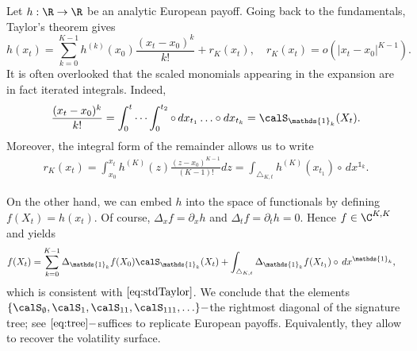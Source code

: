 \begin{example}
Let $h:\R\to \R$ be an analytic European payoff.
Going back to the fundamentals, Taylor's theorem gives %
\begin{equation}\label{eq:stdTaylor}
    h(x_t)= \sum_{k=0}^{K-1} h^{(k)}(x_0) \frac{(x_t-x_0)^k}{k!} + r_K(x_t), \quad r_K(x_t)= o(|x_t-x_0|^{K-1}).
\end{equation}
 It is often overlooked that the scaled monomials appearing in the expansion are in fact iterated integrals. Indeed, 
$$\frac{(x_t-x_0)^k}{k!} = \int_0^t \cdots \int_0^{t_2} \circ \, dx_{t_1}\ldots \circ dx_{t_k} = \calS_{\mathds{1}_k}(X_t). $$ 
Moreover, the integral form of the remainder allows us to write
\begin{align*}
    r_K(x_t) = \int_{x_0}^{x_t} h^{(K)}(z) \frac{(z-x_0)^{K-1}}{(K-1)!} dz 
    = \int_{\triangle_{K,t}} h^{(K)}(x_{t_1}) \circ \, dx^{\mathds{1}_k}.
\end{align*}

On the other hand, we can embed $h$ into the space of functionals by defining
$f(X_t) = h(x_t)$. Of course, $\Delta_x f = \partial_x h$ and $\Delta_t f = \partial_t h = 0$. Hence $f\in \C^{K,K}$ and   yields
\begin{align*}
    f(X_t)  %
    &= \sum_{k=0}^{K-1} \Delta_{\mathds{1}_k} f(X_0)\calS_{\mathds{1}_k}(X_t) +  \int_{\triangle_{K,t}} \Delta_{\mathds{1}_k} f(X_{t_1}) \circ \, dx^{\mathds{1}_k},
\end{align*}
which is consistent with $\eqref{eq:stdTaylor}$. We conclude that the elements $\{\calS_{\emptyset}, \calS_{1},\calS_{11},\calS_{111}, \ldots\}-$the rightmost diagonal of the signature tree; see $\eqref{eq:tree}-$suffices to replicate European payoffs. Equivalently, they allow to  recover the volatility surface. 

\end{example} 
    
